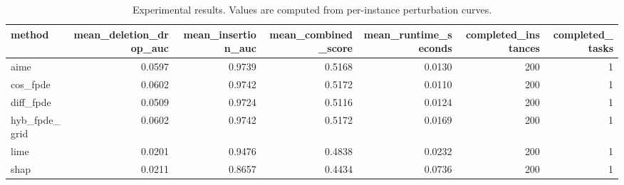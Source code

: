 \begin{table}[t]
\caption{Experimental results. Values are computed from per-instance perturbation curves.}
\label{tab:main_results_computed}
\centering
\begin{tabular}{lrrrrrr}
\toprule
method & mean\_deletion\_drop\_auc & mean\_insertion\_auc & mean\_combined\_score & mean\_runtime\_seconds & completed\_instances & completed\_tasks \\
\midrule
aime & 0.0597 & 0.9739 & 0.5168 & 0.0130 & 200 & 1 \\
cos\_fpde & 0.0602 & 0.9742 & 0.5172 & 0.0110 & 200 & 1 \\
diff\_fpde & 0.0509 & 0.9724 & 0.5116 & 0.0124 & 200 & 1 \\
hyb\_fpde\_grid & 0.0602 & 0.9742 & 0.5172 & 0.0169 & 200 & 1 \\
lime & 0.0201 & 0.9476 & 0.4838 & 0.0232 & 200 & 1 \\
shap & 0.0211 & 0.8657 & 0.4434 & 0.0736 & 200 & 1 \\
\bottomrule
\end{tabular}

\end{table}
